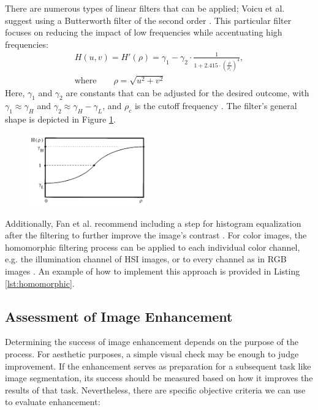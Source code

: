 \documentclass[sigconf]{acmart}
\begin{document}
There are numerous types of linear filters that can be applied; Voicu et al. suggest using a Butterworth filter of the second order \cite{voicu1997practical}. This particular filter focuses on reducing the impact of low frequencies while accentuating high frequencies:
\begin{align}
	H(u, v) = H'(\rho) = \gamma_1  - \gamma_2 \cdot \frac{1}{1 + 2.415 \cdot \left(\frac{\rho}{\rho_c}\right)^{4}},\\
	\text{where} \qquad \rho = \sqrt{u^2 + v^2}
\end{align}
Here, $\gamma_1$ and $\gamma_2$ are constants that can be adjusted for the desired outcome, with $\gamma_1 \approx \gamma_H$ and $\gamma_2 \approx \gamma_H - \gamma_L$, and $\rho_c$ is the cutoff frequency \cite{voicu1997practical}. The filter's general shape is depicted in Figure \ref{fig:homomorphic-filter}.

\begin{figure}
	\centering
	\includegraphics[width=0.45\textwidth]{images/filter.png}
	\label{fig:homomorphic-filter}
\end{figure}

Additionally, Fan et al. recommend including a step for histogram equalization after the filtering to further improve the image's contrast \cite{fan2011homomorphic}. For color images, the homomorphic filtering process can be applied to each individual color channel,  e.g. the illumination channel of HSI images, or to every channel as in RGB images \cite{voicu1997practical,fan2011homomorphic}. An example of how to implement this approach is provided in Listing \ref{lst:homomorphic}.

\subsection{Assessment of Image Enhancement}\label{sec:evaluation}
Determining the success of image enhancement depends on the purpose of the process. For aesthetic purposes, a simple visual check may be enough to judge improvement. If the enhancement serves as preparation for a subsequent task like image segmentation, its success should be measured based on how it improves the results of that task. Nevertheless, there are specific objective criteria we can use to evaluate enhancement:
\end{document}
